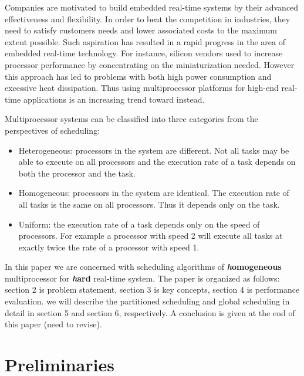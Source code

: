 \documentclass[preprint,12pt]{elsarticle}
\begin{document}
Companies are motivated to build embedded real-time systems by their advanced effectiveness and flexibility. In order to beat the competition in industries, they need to satisfy customers needs and lower associated costs to the maximum extent possible. Such aspiration has resulted in a rapid progress in the area of embedded real-time technology. For instance, silicon vendors used to increase processor performance by concentrating on the miniaturization needed. However this approach has led to problems with both high power consumption and excessive heat dissipation\cite{davis2011survey}. Thus using multiprocessor platforms for high-end real-time applications is an increasing trend toward instead\cite{davis2011survey}.

Multiprocessor systems can be classified into three categories from the perspectives of scheduling\cite{davis2011survey}:

\begin{itemize}
\item Heterogeneous: processors in the system are different. Not all tasks may be able to
execute on all processors and the execution rate of a task depends on both the processor and the task.

\item Homogeneous: processors in the system are identical. The execution rate of all tasks is the same on all processors. Thus it depends only on the task.

\item Uniform: the execution rate of a task depends only on the speed of processors. For example a processor with speed 2 will execute all tasks at exactly twice the rate of a processor with speed 1.
\end{itemize}

In this paper we are concerned with scheduling algorithms of \textbf{\textit homogeneous} multiprocessor  for \textbf{\textit hard} real-time system. The paper is organized as follows: section 2 is problem statement, section 3 is key concepts, section 4 is performance evaluation. we will describe the partitioned scheduling and global scheduling in detail in section 5 and section 6, respectively. A conclusion is given at the end of this paper (need to revise).

\section{Preliminaries} \label{S:2}
\end{document}
